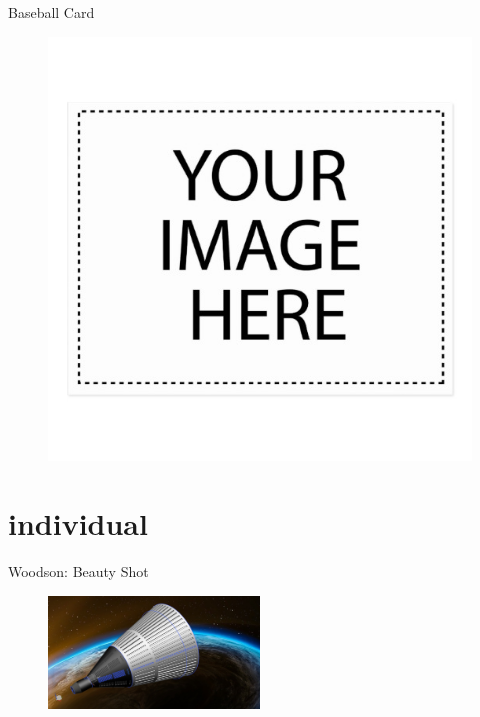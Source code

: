 \documentclass[10pt]{beamer}
\begin{document}
\begin{frame}{Baseball Card}
\begin{minipage}{0.49\textwidth}
	\end{minipage}%
\begin{minipage}{0.49\textwidth}
	\begin{figure}
		\centering
		\includegraphics[width=\textwidth]{Group_Beauty.png}
	\end{figure}
	
\end{minipage}

\end{frame}

\section{individual}


	\begin{frame}{Woodson: Beauty Shot}
\begin{figure}
	\centering
	\includegraphics[width=0.5\textwidth]{Woodson_Beauty.png}
\end{figure}
\end{frame}
\end{document}
